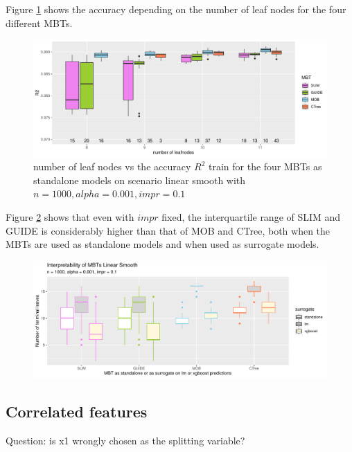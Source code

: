 Figure \ref{fig:ls_1000_standalone_r2_train} shows the accuracy depending on the number of leaf nodes for the four different MBTs.

\begin{figure} \label{fig:ls_1000_standalone_r2_train}
\caption{number of leaf nodes vs the accuracy  $R^2$ train for the four MBTs as standalone models on scenario linear smooth with $n=1000, alpha = 0.001, impr = 0.1$}
    \includegraphics[width=16cm]{Figures/simulations/batchtools/basic_scenarios/linear_smooth/ls_1000_standalone_r2_train.pdf}
\end{figure} 



Figure \ref{fig:ls_1000_int} shows that even with $impr$ fixed, the interquartile range of SLIM and GUIDE is considerably higher than that of MOB and CTree, both when the MBTs are used as standalone models and when used as surrogate models.

\begin{figure} \label{fig:ls_1000_int}
    \includegraphics[width=16cm]{Figures/simulations/batchtools/basic_scenarios/linear_smooth/ls_1000_int.pdf}
\end{figure}  



\newpage
\subsection{Correlated features}
Question: is x1 wrongly chosen as the splitting variable?
